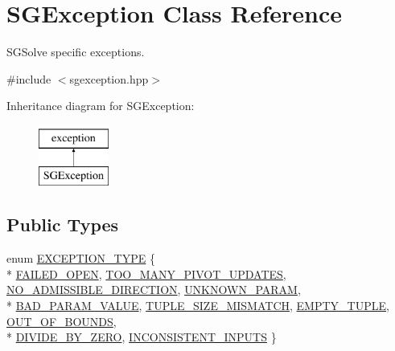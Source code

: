 \hypertarget{classSGException}{\section{S\-G\-Exception Class Reference}
\label{classSGException}
}


S\-G\-Solve specific exceptions.  




{\ttfamily \#include $<$sgexception.\-hpp$>$}

Inheritance diagram for S\-G\-Exception\-:\begin{figure}[H]
\begin{center}
\leavevmode
\includegraphics[height=2.000000cm]{classSGException}
\end{center}
\end{figure}
\subsection*{Public Types}
\begin{DoxyCompactItemize}
\item 
enum \hyperlink{classSGException_af5054226bbd734c10b3a2e6d0505a984}{E\-X\-C\-E\-P\-T\-I\-O\-N\-\_\-\-T\-Y\-P\-E} \{ \\*
\hyperlink{classSGException_af5054226bbd734c10b3a2e6d0505a984ac4d4bd330a5d3f6a68ee833fc2e8863f}{F\-A\-I\-L\-E\-D\-\_\-\-O\-P\-E\-N}, 
\hyperlink{classSGException_af5054226bbd734c10b3a2e6d0505a984a4363917983aaf4cae2aa216b533b1e52}{T\-O\-O\-\_\-\-M\-A\-N\-Y\-\_\-\-P\-I\-V\-O\-T\-\_\-\-U\-P\-D\-A\-T\-E\-S}, 
\hyperlink{classSGException_af5054226bbd734c10b3a2e6d0505a984a84cc279b629fa54e8cd6ae9c575965c4}{N\-O\-\_\-\-A\-D\-M\-I\-S\-S\-I\-B\-L\-E\-\_\-\-D\-I\-R\-E\-C\-T\-I\-O\-N}, 
\hyperlink{classSGException_af5054226bbd734c10b3a2e6d0505a984a8cd6b2cb143a41c3aceb3598146efa1f}{U\-N\-K\-N\-O\-W\-N\-\_\-\-P\-A\-R\-A\-M}, 
\\*
\hyperlink{classSGException_af5054226bbd734c10b3a2e6d0505a984af8bbb19984cd4af6a3f669462eb719f0}{B\-A\-D\-\_\-\-P\-A\-R\-A\-M\-\_\-\-V\-A\-L\-U\-E}, 
\hyperlink{classSGException_af5054226bbd734c10b3a2e6d0505a984aca6084b8d21aed52f067cad6b294a564}{T\-U\-P\-L\-E\-\_\-\-S\-I\-Z\-E\-\_\-\-M\-I\-S\-M\-A\-T\-C\-H}, 
\hyperlink{classSGException_af5054226bbd734c10b3a2e6d0505a984ad2bd8ce3592b4c18f09569f4fca23186}{E\-M\-P\-T\-Y\-\_\-\-T\-U\-P\-L\-E}, 
\hyperlink{classSGException_af5054226bbd734c10b3a2e6d0505a984a186b8c8a4bcdb50bd325c98dd77aea84}{O\-U\-T\-\_\-\-O\-F\-\_\-\-B\-O\-U\-N\-D\-S}, 
\\*
\hyperlink{classSGException_af5054226bbd734c10b3a2e6d0505a984a7382a07da2cb905a6cd8ec97552f07c6}{D\-I\-V\-I\-D\-E\-\_\-\-B\-Y\-\_\-\-Z\-E\-R\-O}, 
\hyperlink{classSGException_af5054226bbd734c10b3a2e6d0505a984ad57b910815cae13368fce8f27c30f78d}{I\-N\-C\-O\-N\-S\-I\-S\-T\-E\-N\-T\-\_\-\-I\-N\-P\-U\-T\-S}
 \}
\end{DoxyCompactItemize}
